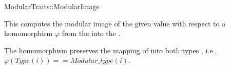 \begin{ccRefFunctionObjectConcept}{ModularTraits::ModularImage}

\ccDefinition

This  computes the modular image of the given value 
with respect to a homomorphism $\varphi$ from the 
 into the .

The homomorphism preserves the mapping of  into both types
, i.e., $\varphi(Type(i)) == Modular\_type(i)$.


\ccTypes
{}


 
\ccRefines 
{} 

\ccSeeAlso
{}

\end{ccRefFunctionObjectConcept}